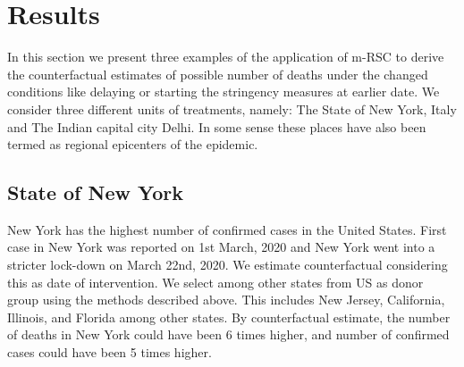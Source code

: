 \documentclass[preprint,authoryear,12pt]{elsarticle}
\begin{document}
\section{Results}
\label{SEC4}
In this section we present three examples of the application of m-RSC to derive the counterfactual estimates of possible number of deaths under the changed conditions like delaying or starting the stringency measures at earlier date. We consider three different units of treatments, namely: The State of New York, Italy and The Indian capital city Delhi. In some sense these places have also been termed as regional epicenters of the epidemic.

	\subsection{State of New York}
	New York has the highest number of confirmed cases in the United States. First case in New York was reported on 1st March, 2020 and New York went into a stricter lock-down on March 22nd, 2020. We estimate counterfactual considering this as date of intervention. We select among other states from US as donor group using the methods described above. This includes New Jersey, California, Illinois, and Florida among other states. By counterfactual estimate, the number of deaths in New York could have been 6 times higher, and number of confirmed cases could have been 5 times higher.
	
\end{document}
